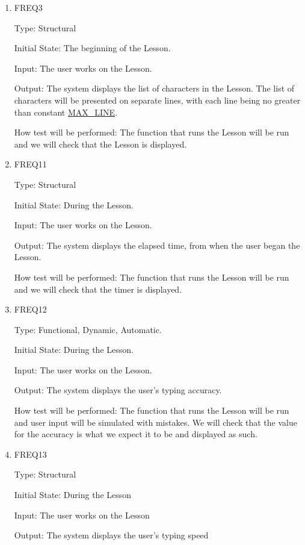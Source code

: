 \documentclass[12pt, titlepage]{article}
\begin{document}
\begin{enumerate}


\item{FREQ3\\}

Type: Structural
					
Initial State: The beginning of the Lesson.
					
Input: The user works on the Lesson.
					
Output: The system displays the list of characters in the Lesson. The list of characters will be presented on separate lines, with each line being no greater than constant \hyperref[symbols]{MAX\_LINE}.

					
How test will be performed: The function that runs the Lesson will be run and we will check that the Lesson is displayed.

\item{FREQ11\\}

Type: Structural
					
Initial State: During the Lesson.
					
Input: The user works on the Lesson.
					
Output: The system displays the elapsed time, from when the user began the Lesson.
					
How test will be performed:  The function that runs the Lesson will be run and we will check that the timer is displayed.

\item{FREQ12\\}
{\color{cyan}
Type: Functional, Dynamic, Automatic.
					
Initial State: During the Lesson.
					
Input: The user works on the Lesson.
					
Output: The system displays the user's typing accuracy.
					
How test will be performed:  The function that runs the Lesson will be run and user input will be simulated with mistakes. We will check that the value for the accuracy is what we expect it to be and displayed as such.}
\item{FREQ13\\}

Type: Structural
					
Initial State: During the Lesson
					
Input: The user works on the Lesson
					
Output: The system displays the user's typing speed
					

\end{enumerate}
\end{document}
